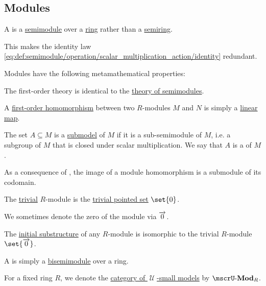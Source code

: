 \subsection{Modules}\label{subsec:modules}

\begin{definition}\label{def:module}
  A  is a \hyperref[def:semimodule]{semimodule} over a \hyperref[def:ring]{ring} rather than a \hyperref[def:semiring]{semiring}.

  This makes the identity law \eqref{eq:def:semimodule/operation/scalar_multiplication_action/identity} redundant.

  Modules have the following metamathematical properties:
  \begin{thmenum}
     The first-order theory is identical to the \hyperref[def:semimodule/theory]{theory of semimodules}.

     A \hyperref[def:first_order_homomorphism]{first-order homomorphism} between two \( R \)-modules \( M \) and \( N \) is simply a \hyperref[def:semimodule/homomorphism]{linear map}.

     The set \( A \subseteq M \) is a \hyperref[thm:substructure_is_model]{submodel} of \( M \) if it is a sub-semimodule of \( M \), i.e. a subgroup of \( M \) that is closed under scalar multiplication. We say that \( A \) is a  of \( M \).

    As a consequence of , the image of a module homomorphism is a submodule of its codomain.

     The \hyperref[rem:trivial_structure]{trivial} \( R \)-module is the \hyperref[rem:pointed_set/trivial]{trivial pointed set} \( \set{ 0 } \).

    We sometimes denote the zero of the module via \( \overrightarrow{0} \).

     The \hyperref[thm:substructures_form_complete_lattice/bottom]{initial substructure} of any \( R \)-module is isomorphic to the trivial \( R \)-module \( \set{ \vect 0 } \).

     A  is simply a \hyperref[def:semimodule/bisemimodule]{bisemimodule} over a ring.

     For a fixed ring \( R \), we denote the \hyperref[def:category_of_small_first_order_models]{category of \( \mscrU \)-small models} by \( \ucat{Mod}_R \).


\end{thmenum}
\end{definition}
